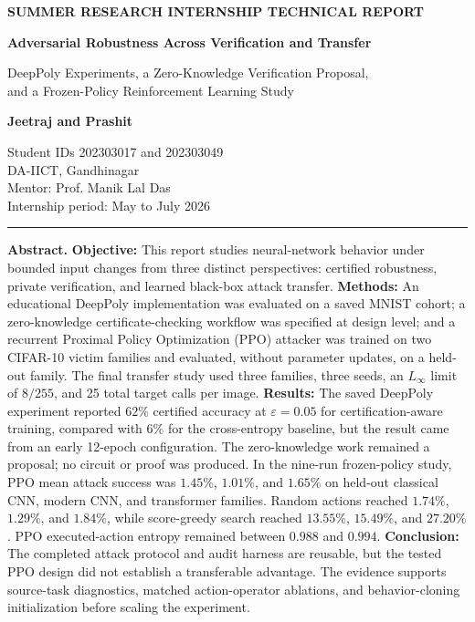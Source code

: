 \documentclass[11pt,a4paper]{article}
\begin{document}
\thispagestyle{firstpage}

\begin{center}
{\small\bfseries\color{researchteal} SUMMER RESEARCH INTERNSHIP TECHNICAL REPORT\par}
\vspace{0.45cm}
{\LARGE\bfseries\color{researchnavy}
Adversarial Robustness Across Verification and Transfer\par}
\vspace{0.22cm}
{\large DeepPoly Experiments, a Zero-Knowledge Verification Proposal,\\
and a Frozen-Policy Reinforcement Learning Study\par}
\vspace{0.55cm}

{\large\bfseries Jeetraj and Prashit\par}
\vspace{0.08cm}
{\small
Student IDs 202303017 and 202303049\\
DA-IICT, Gandhinagar\\
Mentor: Prof. Manik Lal Das\\
Internship period: May to July 2026
\par}
\end{center}

\vspace{0.35cm}
\hrule
\vspace{0.4cm}

\noindent\textbf{\color{researchnavy}Abstract.}
\textbf{Objective:} This report studies neural-network behavior under bounded input changes from three distinct perspectives: certified robustness, private verification, and learned black-box attack transfer.
\textbf{Methods:} An educational DeepPoly implementation was evaluated on a saved MNIST cohort; a zero-knowledge certificate-checking workflow was specified at design level; and a recurrent Proximal Policy Optimization (PPO) attacker was trained on two CIFAR-10 victim families and evaluated, without parameter updates, on a held-out family. The final transfer study used three families, three seeds, an \(L_\infty\) limit of \(8/255\), and 25 total target calls per image.
\textbf{Results:} The saved DeepPoly experiment reported \(62\%\) certified accuracy at \(\varepsilon=0.05\) for certification-aware training, compared with \(6\%\) for the cross-entropy baseline, but the result came from an early 12-epoch configuration. The zero-knowledge work remained a proposal; no circuit or proof was produced. In the nine-run frozen-policy study, PPO mean attack success was \(1.45\%\), \(1.01\%\), and \(1.65\%\) on held-out classical CNN, modern CNN, and transformer families. Random actions reached \(1.74\%\), \(1.29\%\), and \(1.84\%\), while score-greedy search reached \(13.55\%\), \(15.49\%\), and \(27.20\%\). PPO executed-action entropy remained between \(0.988\) and \(0.994\).
\textbf{Conclusion:} The completed attack protocol and audit harness are reusable, but the tested PPO design did not establish a transferable advantage. The evidence supports source-task diagnostics, matched action-operator ablations, and behavior-cloning initialization before scaling the experiment.
\end{document}
